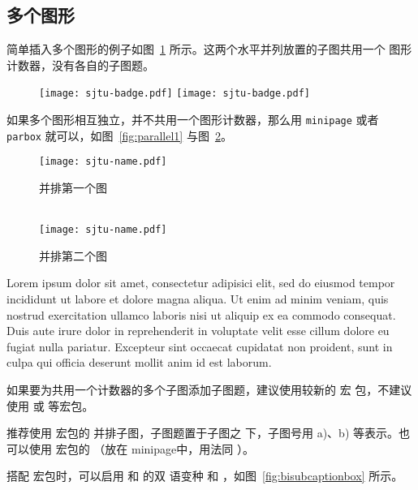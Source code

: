 \subsection{多个图形}

简单插入多个图形的例子如图~\ref{fig:SRR} 所示。这两个水平并列放置的子图共用一个
图形计数器，没有各自的子图题。

\begin{figure}[!htp]
  \centering
  \texttt{[image: sjtu-badge.pdf]}
  \hspace{1cm}
  \texttt{[image: sjtu-badge.pdf]}
  \label{fig:SRR}
\end{figure}

如果多个图形相互独立，并不共用一个图形计数器，那么用 \texttt{minipage} 或者
\texttt{parbox} 就可以，如图~\ref{fig:parallel1} 与图~\ref{fig:parallel2}。

\begin{figure}[!htp]
\begin{minipage}{0.48\textwidth}
  \centering
  \texttt{[image: sjtu-name.pdf]}
  \caption{并排第一个图}
  \label{fig:parallel1}
  \\
  \centering
  \texttt{[image: sjtu-name.pdf]}
  \caption{并排第二个图}
  \label{fig:parallel2}
\end{minipage}
\end{figure}

Lorem ipsum dolor sit amet, consectetur adipisici elit, sed do eiusmod tempor
incididunt ut labore et dolore magna aliqua. Ut enim ad minim veniam, quis
nostrud exercitation ullamco laboris nisi ut aliquip ex ea commodo consequat.
Duis aute irure dolor in reprehenderit in voluptate velit esse cillum dolore eu
fugiat nulla pariatur. Excepteur sint occaecat cupidatat non proident, sunt in
culpa qui officia deserunt mollit anim id est laborum.

如果要为共用一个计数器的多个子图添加子图题，建议使用较新的 宏
包，不建议使用  或  等宏包。

推荐使用  宏包的  并排子图，子图题置于子图之
下，子图号用 a)、b) 等表示。也可以使用  宏包的 
（放在 minipage中，用法同 ）。

搭配  宏包时，可以启用  和  的双
语变种  和 ，如图~\ref{fig:bisubcaptionbox}
所示。

